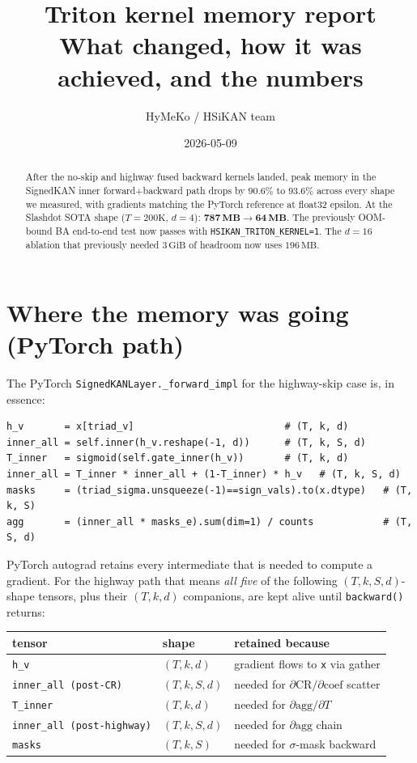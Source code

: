 \documentclass[11pt,a4paper]{article}
\title{\bfseries Triton kernel memory report \\
       \large What changed, how it was achieved, and the numbers}
\author{HyMeKo / HSiKAN team}
\date{2026-05-09}
\begin{document}
\maketitle

\begin{abstract}
\noindent After the no-skip and highway fused backward kernels landed,
peak memory in the SignedKAN inner forward+backward path drops by
$\mathbf{90.6\%}$ to $\mathbf{93.6\%}$ across every shape we measured,
with gradients matching the PyTorch reference at float32 epsilon. At
the Slashdot SOTA shape ($T=200\text{K}$, $d=4$): $\mathbf{787\,MB
\rightarrow 64\,MB}$. The previously OOM-bound BA end-to-end test now
passes with \texttt{HSIKAN\_TRITON\_KERNEL=1}. The $d=16$ ablation
that previously needed $3\,\text{GiB}$ of headroom now uses
$196\,\text{MB}$.
\end{abstract}

\section{Where the memory was going (PyTorch path)}

The PyTorch \texttt{SignedKANLayer.\_forward\_impl} for the highway-skip
case is, in essence:

\begin{verbatim}
h_v       = x[triad_v]                          # (T, k, d)
inner_all = self.inner(h_v.reshape(-1, d))      # (T, k, S, d)
T_inner   = sigmoid(self.gate_inner(h_v))       # (T, k, d)
inner_all = T_inner * inner_all + (1-T_inner) * h_v   # (T, k, S, d)
masks     = (triad_sigma.unsqueeze(-1)==sign_vals).to(x.dtype)   # (T, k, S)
agg       = (inner_all * masks_e).sum(dim=1) / counts            # (T, S, d)
\end{verbatim}

PyTorch autograd retains every intermediate that is needed to compute a
gradient. For the highway path that means \emph{all five} of the
following $(T, k, S, d)$-shape tensors, plus their $(T, k, d)$
companions, are kept alive until \texttt{backward()} returns:

\begin{center}
\begin{tabular}{l l l}
\toprule
\textbf{tensor} & \textbf{shape} & \textbf{retained because} \\
\midrule
\texttt{h\_v}                       & $(T, k, d)$       & gradient flows to \texttt{x} via gather \\
\texttt{inner\_all (post-CR)}       & $(T, k, S, d)$    & needed for $\partial \mathrm{CR}/\partial \mathrm{coef}$ scatter \\
\texttt{T\_inner}                   & $(T, k, d)$       & needed for $\partial \mathrm{agg}/\partial T$ \\
\texttt{inner\_all (post-highway)}  & $(T, k, S, d)$    & needed for $\partial \mathrm{agg}$ chain \\
\texttt{masks}                      & $(T, k, S)$       & needed for $\sigma$-mask backward \\
\bottomrule
\end{tabular}
\end{center}
\end{document}
